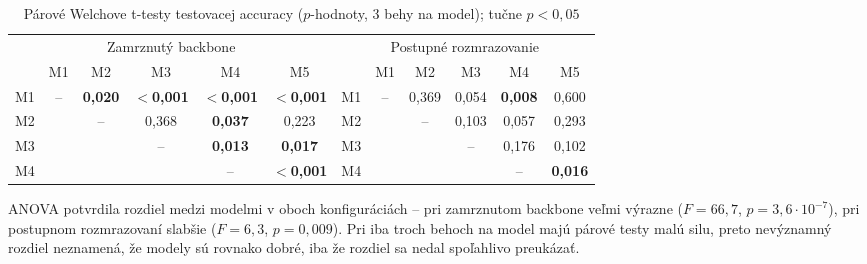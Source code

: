 \begin{table}[H]
    \centering
    \caption{Párové Welchove t-testy testovacej accuracy ($p$-hodnoty, 3 behy na model); tučne $p < 0{,}05$}
    \label{tab:m1m5-ttest}
    \footnotesize
    \begin{tabular}{lccccc@{\hspace{2em}}lccccc}
        \toprule
        \multicolumn{6}{c}{Zamrznutý backbone} & \multicolumn{6}{c}{Postupné rozmrazovanie} \\
        \cmidrule(lr){1-6} \cmidrule(lr){7-12}
           & M1 & M2 & M3 & M4 & M5 &    & M1 & M2 & M3 & M4 & M5 \\
        \midrule
        M1 & --   & \textbf{0,020} & \textbf{$<$0,001} & \textbf{$<$0,001} & \textbf{$<$0,001} & M1 & --    & 0,369 & 0,054 & \textbf{0,008} & 0,600 \\
        M2 &      & --    & 0,368 & \textbf{0,037} & 0,223 & M2 &       & --    & 0,103 & 0,057 & 0,293 \\
        M3 &      &       & --    & \textbf{0,013} & \textbf{0,017} & M3 &       &       & --    & 0,176 & 0,102 \\
        M4 &      &       &       & --    & \textbf{$<$0,001} & M4 &       &       &       & --    & \textbf{0,016} \\
        \bottomrule
    \end{tabular}
\end{table}

\noindent ANOVA potvrdila rozdiel medzi modelmi v oboch konfiguráciách --
pri zamrznutom backbone veľmi výrazne ($F = 66{,}7$, $p = 3{,}6\cdot10^{-7}$),
pri postupnom rozmrazovaní slabšie ($F = 6{,}3$, $p = 0{,}009$). Pri iba
troch behoch na model majú párové testy malú silu, preto nevýznamný
rozdiel neznamená, že modely sú rovnako dobré, iba že rozdiel sa nedal
spoľahlivo preukázať.





